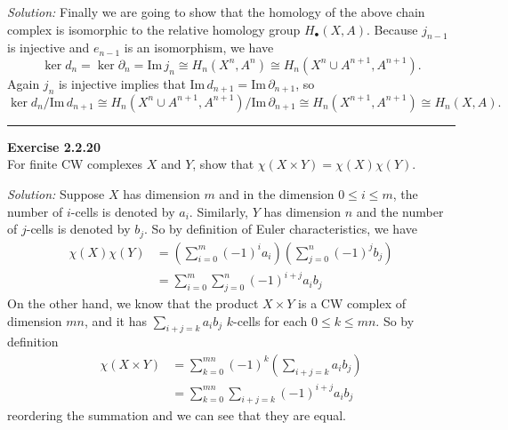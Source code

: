 \documentclass[a4paper, 12pt]{article}
\newenvironment{problem}[2][Exercise]
    { \begin{mdframed}[backgroundcolor=gray!20] \textbf{#1 #2} \\}
    {  \end{mdframed}}
\newenvironment{solution}
    {\textit{Solution:}}
    {}
\begin{document}
\begin{solution}
Finally we are going to show that the homology of the above chain complex is isomorphic to the relative homology group \(H_\bullet(X,A)\). Because \(j_{n-1}\) is injective and \(e_{n-1}\) is an isomorphism, we have 
\[\ker d_n=\ker \partial_n=\text{Im}\, j_n\cong H_n(X^n,A^n)\cong H_n(X^n\cup A^{n+1},A^{n+1}).\]
Again \(j_n\) is injective implies that \(\text{Im}\, d_{n+1}=\text{Im}\, \partial_{n+1}\), so 
\[\ker d_n/\text{Im}\, d_{n+1}\cong H_n(X^n\cup A^{n+1},A^{n+1})/\text{Im}\, \partial_{n+1}\cong H_n(X^{n+1},A^{n+1})\cong H_n(X,A).\]
\end{solution}

\noindent\rule{7in}{2.8pt}
\begin{problem}{2.2.20}
For finite CW complexes \(X\) and \(Y\), show that \(\chi(X\times Y)=\chi(X)\chi(Y)\).
\end{problem}
\begin{solution}
Suppose \(X\) has dimension \(m\) and in the dimension \(0\leq i\leq m\), the number of \(i\)-cells is denoted by \(a_i\). Similarly, \(Y\) has dimension \(n\) and the number of \(j\)-cells is denoted by \(b_j\). So by definition of Euler
characteristics, we have 
\begin{align*}
    \chi(X)\chi(Y)&=(\sum_{i=0}^{m} (-1)^i a_i)(\sum_{j=0}^{n}(-1)^j  b_j)\\ 
                  &=\sum_{i=0}^{m}\sum_{j=0}^{n}(-1)^{i+j} a_ib_j
\end{align*}
On the other hand, we know that the product \(X\times Y\) is a CW complex of dimension \(mn\), and it has \(\sum_{i+j=k} a_ib_j\) \(k\)-cells for each \(0\leq k\leq mn\). So by definition 
\begin{align*}
    \chi (X\times Y)&=\sum_{k=0}^{mn} (-1)^k (\sum_{i+j=k} a_ib_j)\\ 
                    &=\sum_{k=0}^{mn} \sum_{i+j=k} (-1)^{i+j} a_ib_j
\end{align*}
reordering the summation and we can see that they are equal.
\end{solution}
\end{document}
